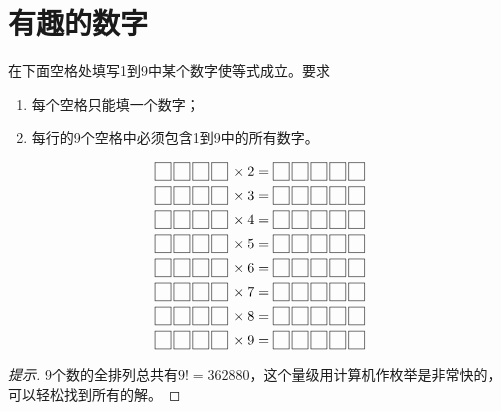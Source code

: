 \section{有趣的数字}
\label{sec:interesting-numbers}

\begin{example}
  在下面空格处填写1到9中某个数字使等式成立。要求
  \begin{enumerate}
  \item 每个空格只能填一个数字；
  \item 每行的9个空格中必须包含1到9中的所有数字。
  \end{enumerate}
  {
  \def\squarebox{\fbox{\phantom{9}}}
  \begin{align*}
    \squarebox\,\squarebox\,\squarebox\,\squarebox\,\times 2 ={}& \squarebox\,\squarebox\,\squarebox\,\squarebox\,\squarebox\\
    \squarebox\,\squarebox\,\squarebox\,\squarebox\,\times 3 ={}& \squarebox\,\squarebox\,\squarebox\,\squarebox\,\squarebox\\
    \squarebox\,\squarebox\,\squarebox\,\squarebox\,\times 4 ={}& \squarebox\,\squarebox\,\squarebox\,\squarebox\,\squarebox\\
    \squarebox\,\squarebox\,\squarebox\,\squarebox\,\times 5 ={}& \squarebox\,\squarebox\,\squarebox\,\squarebox\,\squarebox\\
    \squarebox\,\squarebox\,\squarebox\,\squarebox\,\times 6 ={}& \squarebox\,\squarebox\,\squarebox\,\squarebox\,\squarebox\\
    \squarebox\,\squarebox\,\squarebox\,\squarebox\,\times 7 ={}& \squarebox\,\squarebox\,\squarebox\,\squarebox\,\squarebox\\
    \squarebox\,\squarebox\,\squarebox\,\squarebox\,\times 8 ={}& \squarebox\,\squarebox\,\squarebox\,\squarebox\,\squarebox\\
    \squarebox\,\squarebox\,\squarebox\,\squarebox\,\times 9 ={}& \squarebox\,\squarebox\,\squarebox\,\squarebox\,\squarebox    
  \end{align*}
  }
\end{example}
\begin{proof}[提示]
  9个数的全排列总共有$9!=362880$，这个量级用计算机作枚举是非常快的，可以轻松找到所有的解。
\end{proof}


